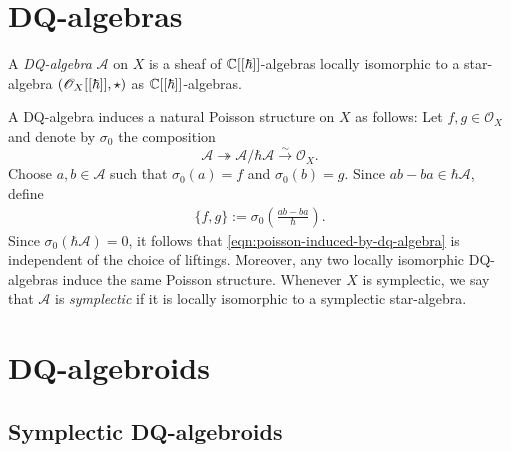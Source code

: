 \section{DQ-algebras}
\begin{definition}\label{def:dq-algebra}
	A \textit{DQ-algebra} $\mathscr{A}$ on $X$ is a sheaf of ${\mathbb C}[[\hbar]]$-algebras locally isomorphic to a star-algebra $(\mathscr{O}_{X}[[\hbar]], \star)$ as ${\mathbb C}[[\hbar]]$-algebras. 
\end{definition}
A DQ-algebra induces a natural Poisson structure on $X$ as follows: Let $f,g \in \mathscr{O}_{X}$ and denote by $\sigma_{0}$ the composition
	\[
		\mathscr{A} \twoheadrightarrow \mathscr{A}/\hbar\mathscr{A} \xrightarrow{\sim} \mathscr{O}_{X}.
	\]
Choose $a, b \in \mathscr{A}$ such that $\sigma_{0}(a) = f$ and $\sigma_{0}(b) = g$. Since $ab - ba \in \hbar\mathscr{A}$, define	
\begin{align}\label{eqn:poisson-induced-by-dq-algebra}
		\{f,g\} := \sigma_{0}\left(\frac{ab - ba}{\hbar}\right).
\end{align}
Since $\sigma_{0}(\hbar\mathscr{A}) = 0$, it follows that \eqref{eqn:poisson-induced-by-dq-algebra} is independent of the choice of liftings. Moreover, any two locally isomorphic DQ-algebras induce the same Poisson structure. Whenever $X$ is symplectic, we say that $\mathscr{A}$ is \emph{symplectic} if it is locally isomorphic to a symplectic star-algebra.


\section{DQ-algebroids}
\subsection{Symplectic DQ-algebroids}
\begin{definition}\label{def:symplectic-DQ-algebroid} 
	
\end{definition}
